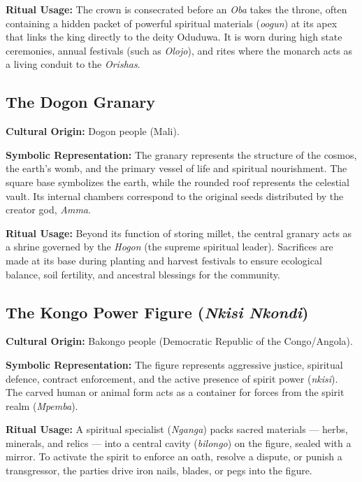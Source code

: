 \documentclass[12pt,a4paper]{article}
\begin{document}
\textbf{Ritual Usage:} The crown is consecrated before an \textit{Oba} takes the throne, often containing a hidden packet of powerful spiritual materials (\textit{oogun}) at its apex that links the king directly to the deity Oduduwa. It is worn during high state ceremonies, annual festivals (such as \textit{Olojo}), and rites where the monarch acts as a living conduit to the \textit{Orishas}.

\subsection{The Dogon Granary}

\textbf{Cultural Origin:} Dogon people (Mali).

\textbf{Symbolic Representation:} The granary represents the structure of the cosmos, the earth's womb, and the primary vessel of life and spiritual nourishment. The square base symbolizes the earth, while the rounded roof represents the celestial vault. Its internal chambers correspond to the original seeds distributed by the creator god, \textit{Amma}.

\textbf{Ritual Usage:} Beyond its function of storing millet, the central granary acts as a shrine governed by the \textit{Hogon} (the supreme spiritual leader). Sacrifices are made at its base during planting and harvest festivals to ensure ecological balance, soil fertility, and ancestral blessings for the community.

\subsection{The Kongo Power Figure (\textit{Nkisi Nkondi})}

\textbf{Cultural Origin:} Bakongo people (Democratic Republic of the Congo/Angola).

\textbf{Symbolic Representation:} The figure represents aggressive justice, spiritual defence, contract enforcement, and the active presence of spirit power (\textit{nkisi}). The carved human or animal form acts as a container for forces from the spirit realm (\textit{Mpemba}).

\textbf{Ritual Usage:} A spiritual specialist (\textit{Nganga}) packs sacred materials --- herbs, minerals, and relics --- into a central cavity (\textit{bilongo}) on the figure, sealed with a mirror. To activate the spirit to enforce an oath, resolve a dispute, or punish a transgressor, the parties drive iron nails, blades, or pegs into the figure.
\end{document}
